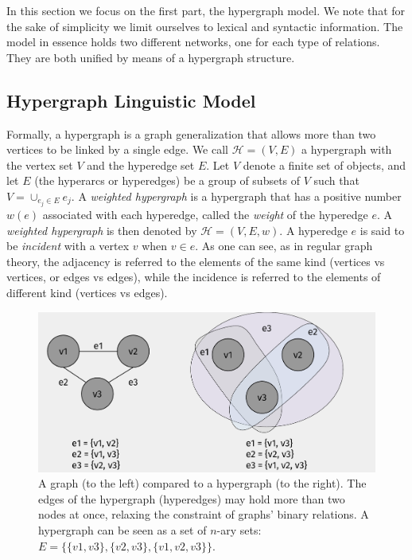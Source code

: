 In this section we focus on the first part, the hypergraph model. We note that for the sake of simplicity we limit ourselves to lexical and syntactic information. The model in essence holds two different networks, one for each type of relations. They are both unified by means of a hypergraph structure. 

\subsection{Hypergraph Linguistic Model}

 Formally, a hypergraph \cite{Berge1985} is a graph generalization  that allows more than two vertices to be linked by a single edge.  We call $\mathcal{H}=(V,E)$ a {hypergraph}
 with the {vertex} set $V$ and the hyperedge set $E$. Let $V$ denote a finite set of objects, and let $E$  (the hyperarcs or hyperedges) be a
group of subsets  of $V$ such that $V = \cup_{e_j \in E}e_j$.
A \emph{weighted hypergraph} is a hypergraph that has a positive number $w(e)$ associated with each hyperedge, called the \emph{weight} of the hyperedge $e$. A \emph{weighted hypergraph} is then denoted by $\mathcal{H}=(V,E,w)$.
%
A hyperedge $e$ is said to be \emph{incident} with a vertex $v$ when
$v \in e$.
 As one can see, as in regular graph theory, the adjacency is referred to the elements of the same kind (vertices vs vertices, or edges vs edges), while the incidence is referred to the elements of different kind (vertices vs edges).

\begin{figure}
\centering
\includegraphics[width=0.7\linewidth]{images/Chapitre3/graph_vs_hgraph.pdf}
\caption{A graph (to the left) compared to a hypergraph (to the right). The edges of the hypergraph (hyperedges) may hold more than two nodes at once, relaxing the constraint of graphs' binary relations. A hypergraph can be seen as a set of $n$-ary sets: $E=\{\{v1,v3\},\{v2,v3\},\{v1,v2,v3\}\}$.}
\label{fig:graph_vs_hgraph}
\end{figure}


